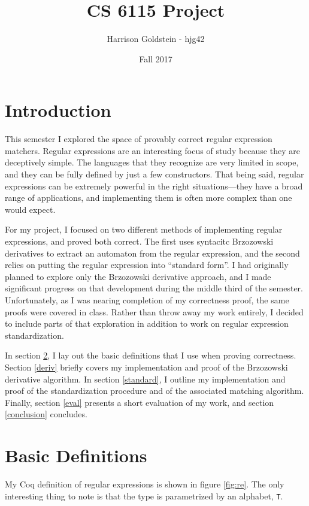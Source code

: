\documentclass{article}
\author{Harrison Goldstein - hjg42}
\title{CS 6115 Project}
\date{Fall 2017}
\newcommand{\coq}[1]{\texttt{#1}}
\begin{document}
\maketitle

\section{Introduction}
This semester I explored the space of provably correct regular expression
matchers. Regular expressions are an interesting focus of study because they are
deceptively simple. The languages that they recognize are very limited in scope,
and they can be fully defined by just a few constructors. That being said,
regular expressions can be extremely powerful in the right situations---they
have a broad range of applications, and implementing them is often more complex
than one would expect.

For my project, I focused on two different methods of implementing regular
expressions, and proved both correct. The first uses syntacitc Brzozowski
derivatives to extract an automaton from the regular expression, and the second
relies on putting the regular expression into ``standard form''. I had
originally planned to explore only the Brzozowski derivative approach, and I
made significant progress on that development during the middle third of the
semester. Unfortunately, as I was nearing completion of my correctness proof,
the same proofs were covered in class. Rather than throw away my work entirely,
I decided to include parts of that exploration in addition to work on regular
expression standardization.

In section \ref{defs}, I lay out the basic definitions that I use when proving
correctness. Section \ref{deriv} briefly covers my implementation and proof of
the Brzozowski derivative algorithm. In section \ref{standard}, I outline my
implementation and proof of the standardization procedure and of the associated
matching algorithm. Finally, section \ref{eval} presents a short evaluation of
my work, and section \ref{conclusion} concludes.


\section{Basic Definitions} \label{defs}
My Coq definition of regular expressions is shown in figure \ref{fig:re}. The
only interesting thing to note is that the type is parametrized by an alphabet,
\coq{T}.
\end{document}
